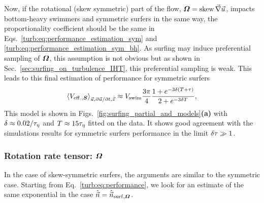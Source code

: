 Now, if the rotational (skew symmetric) part of the flow, $\boldsymbol{\varOmega} = \operatorname{skew} \vec{\nabla} \vec{u}$, impacts bottom-heavy swimmers and symmetric surfers in the same way, the proportionality coefficient should be the same in Eqs.~\eqref{turb:eq:performance_estimation_sym} and \eqref{turb:eq:performance_estimation_sym_bh}.
As surfing may induce preferential sampling of $\boldsymbol{\varOmega}$, this assumption is not obvious but as shown in Sec.~\ref{sec:surfing_on_turbulence_IHT}, this preferential sampling is weak.
This leads to this final estimation of performance for symmetric surfers
\begin{equation}\label{turb:eq:performance_estimation_sym_final}
	 \left\langle V_{\mathrm{eff.}, \boldsymbol{S}} \right\rangle_{\vec{u}, \partial \vec{u} / \partial t, \hat{\vec{z}}} \approx V_{\mathrm{swim}} \frac{3\pi}{4} \frac{1 + e^{-3 \delta ( T + \tau )}}{ 2 + e^{-3 \delta T}},
\end{equation}
This model is shown in Figs.~\ref{fig:surfing_partial_and_models}\textbf{(a)} with $\delta \approx 0.02/\tau_{\eta}$ and $T \approx 15 \tau_{\eta}$ fitted on the data. 
It shows good agreement with the simulations results for symmetric surfers performance in the limit $\delta \tau \gg 1$.

\subsubsection{Rotation rate tensor: $\boldsymbol{\varOmega}$}

In the case of skew-symmetric surfers, the arguments are similar to the symmetric case.
Starting from Eq.~\eqref{turb:eq:performance}, we look for an estimate of the same exponential in the case $\hat{\vec{n}} = \hat{\vec{n}}_{\mathrm{surf}, \boldsymbol{\varOmega}}$.

